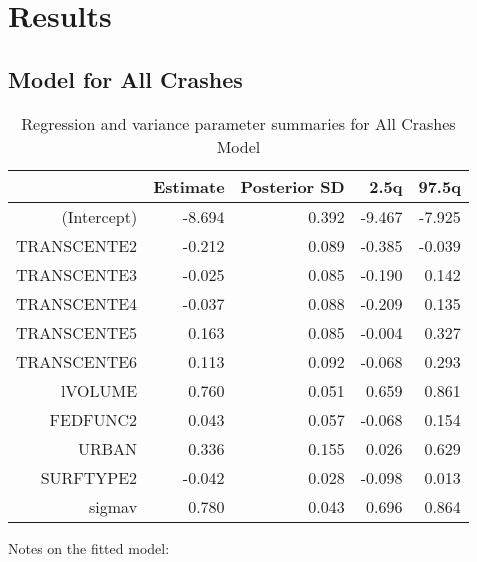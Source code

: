 \documentclass[a4paper]{article}\usepackage[]{graphicx}\usepackage[]{color}
\begin{document}
\clearpage
\section{Results}

\subsection{Model for All Crashes}


\begin{table}[ht]
\centering
\begin{tabular}{rrrrr}
  \hline
 & Estimate & Posterior SD & 2.5q & 97.5q \\ 
  \hline
(Intercept) & -8.694 & 0.392 & -9.467 & -7.925 \\ 
  TRANSCENTE2 & -0.212 & 0.089 & -0.385 & -0.039 \\ 
  TRANSCENTE3 & -0.025 & 0.085 & -0.190 & 0.142 \\ 
  TRANSCENTE4 & -0.037 & 0.088 & -0.209 & 0.135 \\ 
  TRANSCENTE5 & 0.163 & 0.085 & -0.004 & 0.327 \\ 
  TRANSCENTE6 & 0.113 & 0.092 & -0.068 & 0.293 \\ 
  lVOLUME & 0.760 & 0.051 & 0.659 & 0.861 \\ 
  FEDFUNC2 & 0.043 & 0.057 & -0.068 & 0.154 \\ 
  URBAN & 0.336 & 0.155 & 0.026 & 0.629 \\ 
  SURFTYPE2 & -0.042 & 0.028 & -0.098 & 0.013 \\ 
  sigmav & 0.780 & 0.043 & 0.696 & 0.864 \\ 
   \hline
\end{tabular}
\caption{Regression and variance parameter summaries for All Crashes Model} 
\label{allcrash}
\end{table}
Notes on the fitted model:
\end{document}
